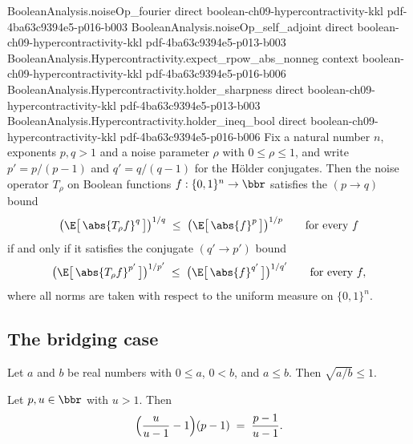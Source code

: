\begin{lemma}
\proofstep
  {BooleanAnalysis.noiseOp_fourier}
  {direct}
  {boolean-ch09-hypercontractivity-kkl}
  {pdf-4ba63c9394e5-p016-b003}
\proofstep
  {BooleanAnalysis.noiseOp_self_adjoint}
  {direct}
  {boolean-ch09-hypercontractivity-kkl}
  {pdf-4ba63c9394e5-p013-b003}
\proofstep
  {BooleanAnalysis.Hypercontractivity.expect_rpow_abs_nonneg}
  {context}
  {boolean-ch09-hypercontractivity-kkl}
  {pdf-4ba63c9394e5-p016-b006}
\proofstep
  {BooleanAnalysis.Hypercontractivity.holder_sharpness}
  {direct}
  {boolean-ch09-hypercontractivity-kkl}
  {pdf-4ba63c9394e5-p013-b003}
\proofstep
  {BooleanAnalysis.Hypercontractivity.holder_ineq_bool}
  {direct}
  {boolean-ch09-hypercontractivity-kkl}
  {pdf-4ba63c9394e5-p016-b006}
Fix a natural number $n$, exponents $p,q>1$ and a noise parameter $\rho$ with $0 \le \rho \le 1$, and write
$p' = p/(p-1)$ and $q' = q/(q-1)$ for the H\"older conjugates. Then the noise operator
$T_\rho$ on Boolean functions $f : \{0,1\}^n \to \bbr$ satisfies the $(p \to q)$ bound
\[
\bigl(\E\bigl[\,\abs{T_\rho f}^q\,\bigr]\bigr)^{1/q} \;\le\;
\bigl(\E\bigl[\,\abs{f}^p\,\bigr]\bigr)^{1/p}
  \qquad \text{for every } f
\]
if and only if it satisfies the conjugate $(q' \to p')$ bound
\[
\bigl(\E\bigl[\,\abs{T_\rho f}^{p'}\,\bigr]\bigr)^{1/p'} \;\le\;
\bigl(\E\bigl[\,\abs{f}^{q'}\,\bigr]\bigr)^{1/q'}
  \qquad \text{for every } f,
\]
where all norms are taken with respect to the uniform measure on $\{0,1\}^n$.
\end{lemma}

\subsection{The bridging case}

\begin{lemma}
\label{BooleanAnalysis.Hypercontractivity.Interpolation.sqrt_div_le_one}
\leanok
{}
Let $a$ and $b$ be real numbers with $0 \le a$, $0 < b$, and $a \le b$. Then $\sqrt{a/b}
\le 1$.
\end{lemma}

\begin{lemma}
\label{BooleanAnalysis.Hypercontractivity.noise_param_eq}
\leanok
{}
Let $p, u \in \bbr$ with $u > 1$. Then
\[
  \Bigl(\frac{u}{u-1} - 1\Bigr)(p-1) \;=\; \frac{p-1}{u-1}.
\]
\end{lemma}

